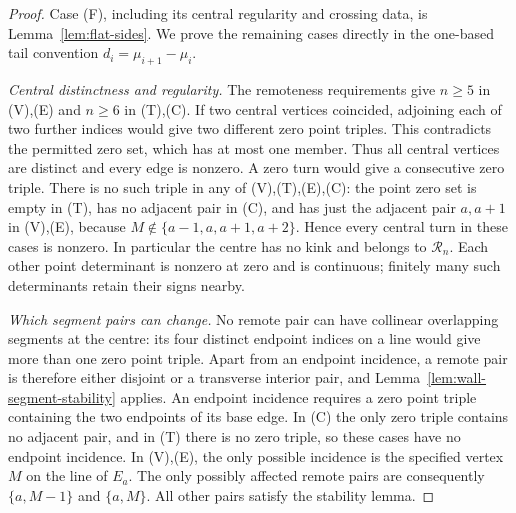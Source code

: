 \begin{proof}
Case (F), including its central regularity and crossing data, is
Lemma~\ref{lem:flat-sides}. We prove the remaining cases directly
in the one-based tail convention $d_i=\mu_{i+1}-\mu_i$.

\emph{Central distinctness and regularity.}
The remoteness requirements give $n\geq5$ in (V),(E) and $n\geq6$ in (T),(C).
If two central vertices coincided, adjoining each of two further indices
would give two different zero point triples. This contradicts the permitted
zero set, which has at most one member. Thus all central vertices are distinct
and every edge is nonzero. A zero turn would give a consecutive zero triple.
There is no such triple in any of (V),(T),(E),(C): the point zero set is empty
in (T), has no adjacent pair in (C), and has just the adjacent pair $a,a+1$
in (V),(E), because $M\notin\{a-1,a,a+1,a+2\}$. Hence every central turn
in these cases is nonzero. In particular the centre has no kink and belongs
to $\mathcal R_n$. Each other point determinant is nonzero at zero and is
continuous; finitely many such determinants retain their signs nearby.

\emph{Which segment pairs can change.}
No remote pair can have collinear overlapping segments at the centre: its
four distinct endpoint indices on a line would give more than one zero
point triple. Apart from an endpoint incidence, a remote pair is therefore
either disjoint or a transverse interior pair, and
Lemma~\ref{lem:wall-segment-stability} applies. An endpoint incidence requires
a zero point triple containing the two endpoints of its base edge. In (C)
the only zero triple contains no adjacent pair, and in (T) there is no zero
triple, so these cases have no endpoint incidence. In (V),(E), the only
possible incidence is the specified vertex $M$ on the line of $E_a$.
The only possibly affected remote pairs are consequently
$\{a,M-1\}$ and $\{a,M\}$. All other pairs satisfy the stability lemma.


\end{proof}
